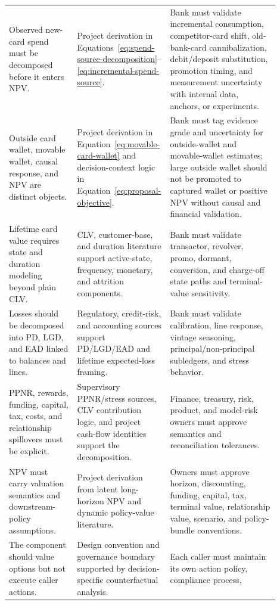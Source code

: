 \documentclass[11pt]{article}
\newcommand{\1}{\mathbf{1}}
\begin{document}
\begin{longtable}{p{0.25\linewidth}p{0.25\linewidth}p{0.40\linewidth}}
Observed new-card spend must be decomposed before it enters NPV.
  & Project derivation in
    Equations~\eqref{eq:spend-source-decomposition}--\eqref{eq:incremental-spend-source}.
  & Bank must validate incremental consumption, competitor-card shift,
    old-bank-card cannibalization, debit/deposit substitution, promotion timing,
    and measurement uncertainty with internal data, anchors, or experiments. \\
Outside card wallet, movable wallet, causal response, and NPV are distinct
objects.
  & Project derivation in Equation~\eqref{eq:movable-card-wallet} and
    decision-context logic in Equation~\eqref{eq:proposal-objective}.
  & Bank must tag evidence grade and uncertainty for outside-wallet and
    movable-wallet estimates; large outside wallet should not be promoted to
    captured wallet or positive NPV without causal and financial validation. \\
Lifetime card value requires state and duration modeling beyond plain CLV.
  & CLV, customer-base, and duration literature support active-state,
    frequency, monetary, and attrition components.
  & Bank must validate transactor, revolver, promo, dormant, conversion, and
    charge-off state paths and terminal-value sensitivity. \\
Losses should be decomposed into PD, LGD, and EAD linked to balances and lines.
  & Regulatory, credit-risk, and accounting sources support PD/LGD/EAD and
    lifetime expected-loss framing.
  & Bank must validate calibration, line response, vintage seasoning,
    principal/non-principal subledgers, and stress behavior. \\
PPNR, rewards, funding, capital, tax, costs, and relationship spillovers must
be explicit.
  & Supervisory PPNR/stress sources, CLV contribution logic, and project
    cash-flow identities support the decomposition.
  & Finance, treasury, risk, product, and model-risk owners must approve
    semantics and reconciliation tolerances. \\
NPV must carry valuation semantics and downstream-policy assumptions.
  & Project derivation from latent long-horizon NPV and dynamic policy-value
    literature.
  & Owners must approve horizon, discounting, funding, capital, tax, terminal
    value, relationship value, scenario, and policy-bundle conventions. \\
The component should value options but not execute caller actions.
  & Design convention and governance boundary supported by decision-specific
    counterfactual analysis.
  & Each caller must maintain its own action policy, compliance process,

\end{longtable}
\end{document}

